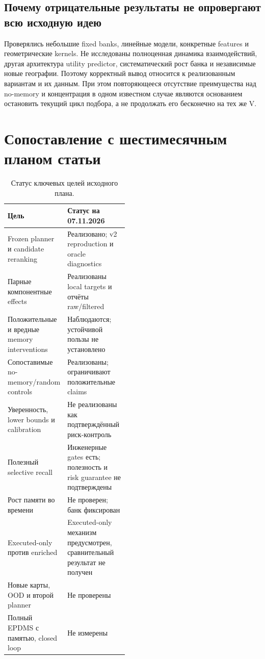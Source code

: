 \documentclass[11pt,a4paper]{article}
\begin{document}
\subsection{Почему отрицательные результаты не опровергают всю исходную идею}
Проверялись небольшие fixed banks, линейные модели, конкретные features и геометрические kernels. Не исследованы полноценная динамика взаимодействий, другая архитектура utility predictor, систематический рост банка и независимые новые географии. Поэтому корректный вывод относится к реализованным вариантам и их данным. При этом повторяющееся отсутствие преимущества над no-memory и концентрация в одном известном случае являются основанием остановить текущий цикл подбора, а не продолжать его бесконечно на тех же V.

\section{Сопоставление с шестимесячным планом статьи}
\par
\begin{table}[htbp]\centering\small
\caption{Статус ключевых целей исходного плана.}
\begin{tabularx}{\linewidth}{@{}p{0.47\linewidth}X@{}}\toprule
Цель & Статус на 07.11.2026\\\midrule
Frozen planner и candidate reranking & Реализовано; v2 reproduction и oracle diagnostics\\
Парные компонентные effects & Реализованы local targets и отчёты raw/filtered\\
Положительные и вредные memory interventions & Наблюдаются; устойчивой пользы не установлено\\
Сопоставимые no-memory/random controls & Реализованы; ограничивают положительные claims\\
Уверенность, lower bounds и calibration & Не реализованы как подтверждённый риск-контроль\\
Полезный selective recall & Инженерные gates есть; полезность и risk guarantee не подтверждены\\
Рост памяти во времени & Не проверен; банк фиксирован\\
Executed-only против enriched & Executed-only механизм предусмотрен, сравнительный результат не получен\\
Новые карты, OOD и второй planner & Не проверены\\
Полный EPDMS с памятью, closed loop & Не измерены\\\bottomrule
\end{tabularx}
\end{table}
\par
\end{document}
